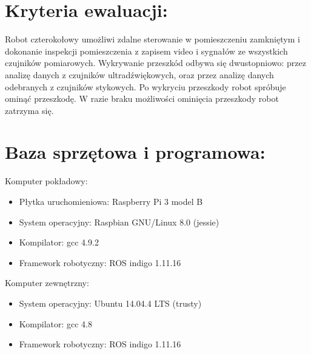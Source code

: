 \documentclass[a4paper]{article}
\begin{document}
\section{ Kryteria ewaluacji:}

Robot czterokołowy umożliwi zdalne sterowanie w pomieszczeniu zamkniętym i dokonanie inspekcji pomieszczenia z zapisem video i sygnałów ze wszystkich czujników pomiarowych. Wykrywanie przeszkód odbywa się dwustopniowo: przez analizę danych z czujników ultradźwiękowych, oraz przez analizę danych odebranych z czujników stykowych. Po wykryciu przeszkody robot spróbuje ominąć przeszkodę. W razie braku możliwości ominięcia przeszkody robot zatrzyma się.

\section{ Baza sprzętowa i programowa:}
Komputer pokładowy:
\begin{itemize}
\item Płytka uruchomieniowa: Raspberry Pi 3 model B
\item System operacyjny:     Raspbian GNU/Linux 8.0 (jessie)
\item Kompilator:            gcc 4.9.2
\item Framework robotyczny:  ROS indigo 1.11.16
\end{itemize}

Komputer zewnętrzny:
\begin{itemize}
\item System operacyjny:     Ubuntu 14.04.4 LTS (trusty)
\item Kompilator:            gcc 4.8
\item Framework robotyczny:  ROS indigo 1.11.16
\end{itemize}
\end{document}
